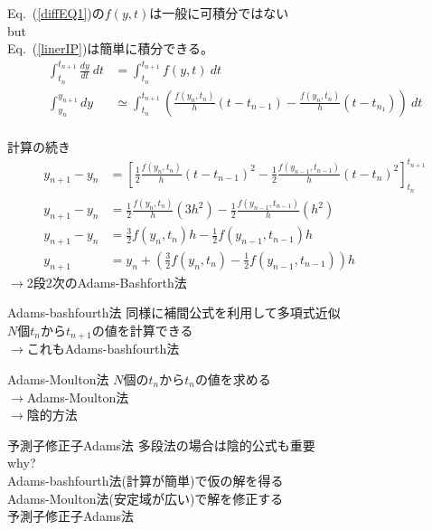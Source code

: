 \documentclass[unicode, 12pt, aspectratio=169]{beamer}
\newcommand{\eref}[1]{Eq.~(\ref{#1})}
\begin{document}
\begin{frame}
    \eref{diffEQ1}の$f(y,t)$は一般に可積分ではない\\
    \alert{but}\\
    \eref{linerIP}は簡単に積分できる。
    \begin{align}
      \int^{t_{n+1}}_{t_n}\frac{dy}{dt}\:dt &= \int^{t_{n+1}}_{t_n}f(y, t)\: dt \nonumber\\
      \int^{y_{n+1}}_{y_n}dy &\simeq \int^{t_{n+1}}_{t_n}\left(\frac{f(y_n,t_n)}{h}(t-t_{n-1}) -
      \frac{f(y_n, t_n)}{h}(t-t_{n_1})\right)\:dt\nonumber\\
    \end{align}
\end{frame}
\begin{frame}
  計算の続き
    \begin{align}
      y_{n+1}-y_n &= \left[\frac{1}{2}\frac{f(y_n,t_n)}{h}(t-t_{n-1})^2 -
      \frac{1}{2}\frac{f(y_{n-1}, t_{n-1})}{h}(t-t_{n})^2\right]^{t_{n+1}}_{t_n} \nonumber\\
      y_{n+1}-y_n &=  \frac{1}{2}\frac{f(y_n,t_n)}{h}(3h^2) - \frac{1}{2}\frac{f(y_{n-1}, t_{n-1})}{h}(h^2)\nonumber\\
      y_{n+1}-y_n &=  \frac{3}{2}f(y_n,t_n)h - \frac{1}{2}f(y_{n-1}, t_{n-1})h\nonumber\\
      y_{n+1} &= y_n + \left(\frac{3}{2}f(y_n,t_n) - \frac{1}{2}f(y_{n-1},t_{n-1})\right)h
    \end{align}
    $\rightarrow$2段2次のAdams-Bashforth法
\end{frame}

\begin{frame}
  \begin{block}{Adams-bashfourth法}
    同様に補間公式を利用して多項式近似\\
    $N$個$t_n$から$t_{n+1}$の値を計算できる\\
    $\rightarrow$これもAdams-bashfourth法\\
  \end{block}

  \begin{block}{Adams-Moulton法}
    $N$個の$t_n$から$t_n$の値を求める\\
    $\rightarrow$Adams-Moulton法\\
    $\rightarrow$陰的方法\\
  \end{block}

  \begin{block}{予測子修正子Adams法}
    多段法の場合は陰的公式も重要\\
    \alert{why?}\\
    Adams-bashfourth法(計算が簡単)で仮の解を得る\\
    Adams-Moulton法(安定域が広い)で解を修正する\\
    予測子修正子Adams法
  \end{block}
\end{frame}
\end{document}
